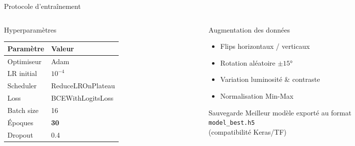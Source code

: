 \documentclass[aspectratio=169, 12pt]{beamer}
\begin{document}
\begin{frame}{Protocole d'entraînement}
  \begin{columns}[T]

    \begin{column}{0.48\textwidth}
      \begin{block}{\faCog\; Hyperparamètres}
        \small
        \begin{tabular}{@{}ll@{}}
          \toprule
          \textbf{Paramètre} & \textbf{Valeur} \\
          \midrule
          Optimiseur   & Adam \\
          LR initial   & $10^{-4}$ \\
          Scheduler    & ReduceLROnPlateau \\
          Loss         & BCEWithLogitsLoss \\
          Batch size   & 16 \\
          Époques      & \textbf{30} \\
          Dropout      & 0.4 \\
          \bottomrule
        \end{tabular}
      \end{block}
    \end{column}

    \begin{column}{0.48\textwidth}
      \begin{block}{\faRecycle\; Augmentation des données}
        \begin{itemize}
          \item Flips horizontaux / verticaux
          \item Rotation aléatoire $\pm 15°$
          \item Variation luminosité \& contraste
          \item Normalisation Min-Max
        \end{itemize}
      \end{block}

      \vspace{0.3em}
      \begin{alertblock}{\faSave\; Sauvegarde}
        Meilleur modèle exporté au format\\
        \texttt{model\_best.h5}\\
        (compatibilité Keras/TF)
      \end{alertblock}
    \end{column}

  \end{columns}
\end{frame}
\end{document}
